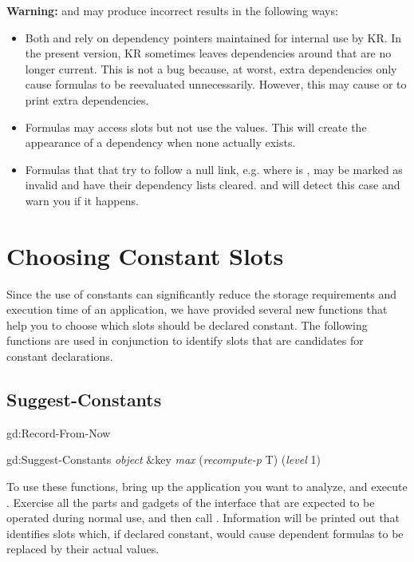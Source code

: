 {\bf Warning:}  and 
may produce incorrect results in the following ways:
\begin{itemize}
\item Both  and  rely on dependency
pointers maintained for internal use by KR.
In the present version,
KR sometimes leaves dependencies around that are no longer current.
This is not a bug because, at worst, extra dependencies only cause
formulas to be reevaluated unnecessarily.  However, this may cause
 or  to print extra dependencies.

\item Formulas may access slots but not use the values.  This will create
the appearance of a dependency when none actually exists.

\item Formulas that that try to follow a null link, e.g.
 where  is
, may be marked as invalid and have their dependency lists cleared.
 and  will detect this case and
warn you if it happens.
\end{itemize}


\chapter{Choosing Constant Slots}

Since the use of constants can significantly reduce the storage requirements
and execution time of an application, we have provided several new functions
that help you to choose which slots should be declared constant.  The following
functions are used in conjunction to identify slots that are candidates for
constant declarations.


\section{Suggest-Constants}
\label{suggest-constants}

 
\begin{programexample}
gd:Record-From-Now\value{function}

gd:Suggest-Constants {\it object} \&key {\it max} ({\it recompute-p} T) ({\it level} 1)\value{function}
\end{programexample}

To use these functions, bring up the application you want to analyze, and
execute .  Exercise all the parts and gadgets of the
interface that are expected to be operated during normal use, and then
call .  Information will be printed out that identifies
slots which, if declared constant, would cause dependent formulas to be
replaced by their actual values.


